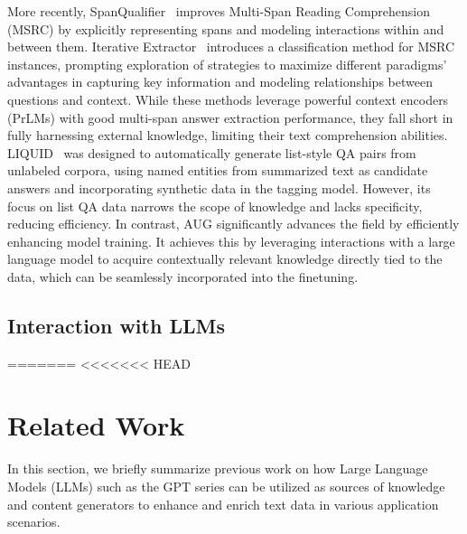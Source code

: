 More recently, SpanQualifier~\cite{huang2023qualifier} improves Multi-Span Reading Comprehension (MSRC) by explicitly representing spans and modeling interactions within and between them.
Iterative Extractor~\cite{zhang2023many} introduces a classification method for MSRC instances, prompting exploration of strategies to maximize different paradigms' advantages in capturing key information and modeling relationships between questions and context.
While these methods leverage powerful context encoders (PrLMs) with good multi-span answer extraction performance, they fall short in fully harnessing external knowledge, limiting their text comprehension abilities.
LIQUID~\cite{lee2023liquid} was designed to automatically generate list-style QA pairs from unlabeled corpora, using named entities from summarized text as candidate answers and incorporating synthetic data in the tagging model. However, its focus on list QA data narrows the scope of knowledge and lacks specificity, reducing efficiency.
In contrast, AUG significantly advances the field by efficiently enhancing model training. It achieves this by leveraging interactions with a large language model to acquire contextually relevant knowledge directly tied to the data, which can be seamlessly incorporated into the finetuning.


\subsection{Interaction with LLMs}
=======
<<<<<<< HEAD

\section{Related Work}
\label{sec:related}
In this section, we briefly summarize previous work on how Large Language Models (LLMs) such as the GPT series can be utilized as sources of knowledge and content generators to enhance and enrich text data in various application scenarios.

